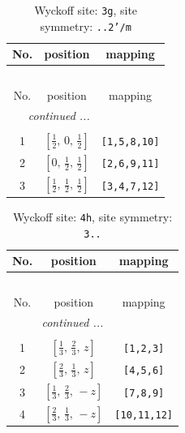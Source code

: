 \documentclass[fleqn,8pt]{jsarticle}
\begin{document}
\begin{longtable}{ccc}
\caption{Wyckoff site: {\tt 3g}, site symmetry: {\tt ..2'/m}}
 \\
 \hline \hline
No. & position & mapping \\ \hline \endfirsthead

\multicolumn{2}{l}{\tablename\ \thetable{}} \\
 \hline \hline
No. & position & mapping \\ \hline \endhead

 \hline \hline
\multicolumn{2}{r}{\footnotesize\it continued ...} \\ \endfoot

 \hline \hline
\multicolumn{2}{r}{} \\ \endlastfoot

1 & $\left[ \frac{1}{2},\, 0,\, \frac{1}{2} \right]$ & {\tt [1,5,8,10]} \\ \hline
2 & $\left[ 0,\, \frac{1}{2},\, \frac{1}{2} \right]$ & {\tt [2,6,9,11]} \\ \hline
3 & $\left[ \frac{1}{2},\, \frac{1}{2},\, \frac{1}{2} \right]$ & {\tt [3,4,7,12]} \\
\end{longtable}
\renewcommand{\arraystretch}{1.2}
\begin{longtable}{ccc}
\caption{Wyckoff site: {\tt 4h}, site symmetry: {\tt 3..}}
 \\
 \hline \hline
No. & position & mapping \\ \hline \endfirsthead

\multicolumn{2}{l}{\tablename\ \thetable{}} \\
 \hline \hline
No. & position & mapping \\ \hline \endhead

 \hline \hline
\multicolumn{2}{r}{\footnotesize\it continued ...} \\ \endfoot

 \hline \hline
\multicolumn{2}{r}{} \\ \endlastfoot

1 & $\left[ \frac{1}{3},\, \frac{2}{3},\, z \right]$ & {\tt [1,2,3]} \\ \hline
2 & $\left[ \frac{2}{3},\, \frac{1}{3},\, z \right]$ & {\tt [4,5,6]} \\ \hline
3 & $\left[ \frac{1}{3},\, \frac{2}{3},\, - z \right]$ & {\tt [7,8,9]} \\ \hline
4 & $\left[ \frac{2}{3},\, \frac{1}{3},\, - z \right]$ & {\tt [10,11,12]} \\
\end{longtable}
\end{document}
